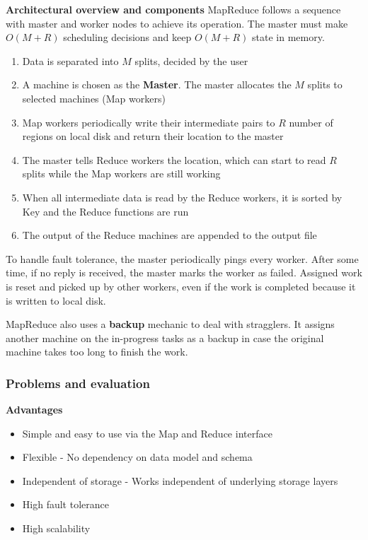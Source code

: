 \documentclass{sty/SizheArticle}
\begin{document}

\textbf{Architectural overview and components}
MapReduce follows a sequence with master and worker nodes to achieve its
operation. The master must make $O(M + R)$ scheduling decisions and keep
$O(M + R)$ state in memory.
\begin{enumerate}
\item Data is separated into $M$ splits, decided by the user
\item A machine is chosen as the \textbf{Master}. The master allocates the $M$
splits to selected machines (Map workers)
\item Map workers periodically write their intermediate pairs to $R$ number
of regions on local disk and return their location to the master
\item The master tells Reduce workers the location, which can start to read
$R$ splits while the Map workers are still working
\item When all intermediate data is read by the Reduce workers, it is
sorted by Key and the Reduce functions are run
\item The output of the Reduce machines are appended to the output file
\end{enumerate}

To handle fault tolerance, the master periodically pings every worker. After
some time, if no reply is received, the master marks the worker as failed.
Assigned work is reset and picked up by other workers, even if the work is
completed because it is written to local disk.

MapReduce also uses a \textbf{backup} mechanic to deal with stragglers. It
assigns another machine on the in-progress tasks as a backup in case the
original machine takes too long to finish the work.

\subsubsection{Problems and evaluation}
\textbf{Advantages}
\begin{itemize}
\item Simple and easy to use via the Map and Reduce interface
\item Flexible - No dependency on data model and schema
\item Independent of storage - Works independent of underlying storage layers
\item High fault tolerance
\item High scalability
\end{itemize}
\end{document}
